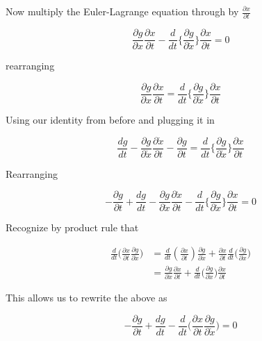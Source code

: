 \documentclass[11pt,letterpaper,onecolumn,notitlepage]{article}
\begin{document}
  Now multiply the Euler-Lagrange equation through by $\frac{\partial{}x}{\partial{}t}$

  \begin{equation*}
    \frac{\partial{}g}{\partial{}x}\frac{\partial{}x}{\partial{}t}-\frac{d}{dt}\biggr\{\frac{\partial{}g}{\partial\dot{x}}\biggr\}\frac{\partial{}x}{\partial{}t}=0
  \end{equation*}

  rearranging

  \begin{equation*}
    \frac{\partial{}g}{\partial{}x}\frac{\partial{}x}{\partial{}t}=\frac{d}{dt}\biggr\{\frac{\partial{}g}{\partial\dot{x}}\biggr\}\frac{\partial{}x}{\partial{}t}
  \end{equation*}

  Using our identity from before and plugging it in

  \begin{equation*}
    \frac{dg}{dt}-\frac{\partial{}g}{\partial\dot{x}}\frac{\partial\dot{x}}{\partial{}t}-\frac{\partial{}g}{\partial{}t}=\frac{d}{dt}\biggr\{\frac{\partial{}g}{\partial\dot{x}}\biggr\}\frac{\partial{}x}{\partial{}t}
  \end{equation*}

  Rearranging

  \begin{equation*}
  -\frac{\partial{}g}{\partial{}t}+\frac{dg}{dt}-\frac{\partial{}g}{\partial\dot{x}}\frac{\partial\dot{x}}{\partial{}t}-\frac{d}{dt}\biggr\{\frac{\partial{}g}{\partial\dot{x}}\biggr\}\frac{\partial{}x}{\partial{}t}=0
  \end{equation*}

  Recognize by product rule that

  \begin{align*}
    \frac{d}{dt}\biggr(\frac{\partial{}x}{\partial{}t}\frac{\partial{}g}{\partial\dot{x}}\biggr)&=
    \frac{d}{dt}\left(\frac{\partial{}x}{\partial{}t}\right)\frac{\partial{}g}{\partial\dot{x}}+\frac{\partial{}x}{\partial{}t}\frac{d}{dt}\biggr(\frac{\partial{}g}{\partial\dot{x}}\biggr) \\
    &=\frac{\partial{}g}{\partial\dot{x}}\frac{\partial\dot{x}}{\partial{}t}+\frac{d}{dt}\biggr(\frac{\partial{}g}{\partial\dot{x}}\biggr)\frac{\partial{}x}{\partial{}t}
  \end{align*}

  This allows us to rewrite the above as

  \begin{equation*}
    -\frac{\partial{}g}{\partial{}t}+\frac{dg}{dt}-\frac{d}{dt}\biggr(\frac{\partial{}x}{\partial{}t}\frac{\partial{}g}{\partial\dot{x}}\biggr)=0
  \end{equation*}
\end{document}
